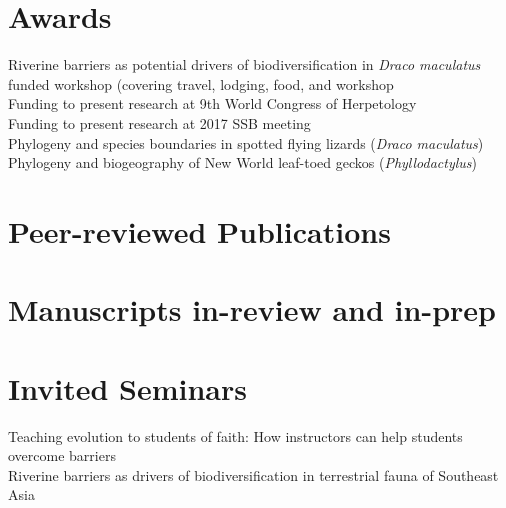 \documentclass[11pt,a4paper,sans]{moderncv}        %
\begin{document}
\section{Awards}
\small{\tabto{1.25cm}Riverine barriers as potential drivers of biodiversification in \textit{Draco maculatus}} \\
\small{\tabto{1.25cm}funded workshop (covering travel, lodging, food, and workshop} \\
\small{\tabto{1.25cm}Funding to present research at 9th World Congress of Herpetology} \\
\small{\tabto{1.25cm}Funding to present research at 2017 SSB meeting} \\
\small{\tabto{1.25cm}Phylogeny and species boundaries in spotted flying lizards (\textit{Draco maculatus})} \\
\small{\tabto{1.25cm}Phylogeny and biogeography of New World leaf-toed geckos (\textit{Phyllodactylus})} \\

\section{Peer-reviewed Publications}
\begin{refsection}
\nocite{*}
\printbibliography[heading=none]
\end{refsection}

\section{Manuscripts in-review and in-prep}
\begin{refsection}
\nocite{*}
\printbibliography[heading=none]
\end{refsection}

\section{Invited Seminars}
\small{}
\footnotesize{\tabto{1.25cm}Teaching evolution to students of faith: How instructors can help students overcome barriers} \\
\small{}
\footnotesize{\tabto{1.25cm}Riverine barriers as drivers of biodiversification in terrestrial fauna of Southeast Asia}
\small{\tabto{1.25cm}}
\end{document}
